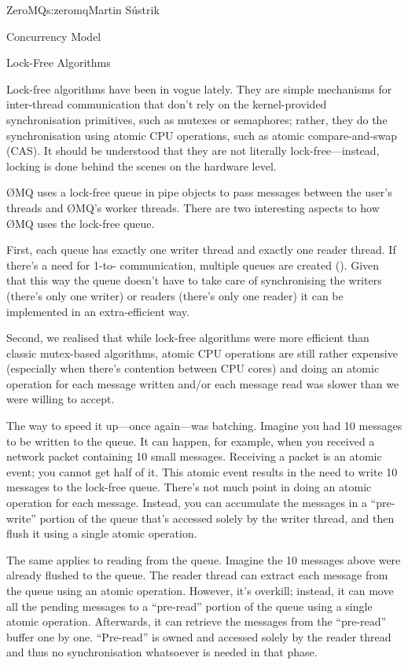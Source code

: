 \begin{aosachapter}{ZeroMQ}{s:zeromq}{Martin S\'{u}strik}
\begin{aosasect1}{Concurrency Model}
\end{aosasect1}

\begin{aosasect1}{Lock-Free Algorithms}

Lock-free algorithms have been in vogue lately. They are simple
mechanisms for inter-thread communication that don't rely on the
kernel-provided synchronisation primitives, such as mutexes or
semaphores; rather, they do the synchronisation using atomic CPU
operations, such as atomic compare-and-swap (CAS). It should be
understood that they are not literally lock-free---instead, locking is
done behind the scenes on the hardware level.

{\O}MQ uses a lock-free queue in pipe objects to pass messages between the
user's threads and {\O}MQ's worker threads. There are two interesting
aspects to how {\O}MQ uses the lock-free queue.

First, each queue has exactly one writer thread and exactly one reader
thread. If there's a need for 1-to- communication, multiple queues
are created ().  Given that this way
the queue doesn't have to take care of synchronising the writers
(there's only one writer) or readers (there's only one reader) it can
be implemented in an extra-efficient way.


Second, we realised that while lock-free algorithms were more
efficient than classic mutex-based algorithms, atomic CPU operations
are still rather expensive (especially when there's contention between
CPU cores) and doing an atomic operation for each message written
and/or each message read was slower than we were willing to accept.

The way to speed it up---once again---was batching.  Imagine you had
10 messages to be written to the queue. It can happen, for example,
when you received a network packet containing 10 small
messages. Receiving a packet is an atomic event; you cannot get 
half of it. This atomic event results in the need to write 10 messages to
the lock-free queue. There's not much point in doing an atomic
operation for each message. Instead, you can accumulate the messages
in a ``pre-write'' portion of the queue that's accessed solely by the
writer thread, and then flush it using a single atomic operation.

The same applies to reading from the queue. Imagine the 10 messages above
were already flushed to the queue. The reader thread can extract each
message from the queue using an atomic operation. However, it's 
overkill; instead, it can move all the pending messages to a
``pre-read'' portion of the queue using a single atomic
operation. Afterwards, it can retrieve the messages from the ``pre-read''
buffer one by one. ``Pre-read'' is owned and accessed solely by the
reader thread and thus no synchronisation whatsoever is needed in that
phase.


\end{aosasect1}
\end{aosachapter}

